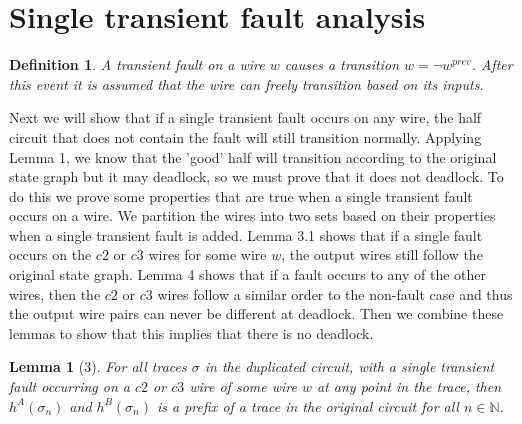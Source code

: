 \documentclass[12pt]{report}
\newtheorem*{definition}{Definition}
\newtheorem*{lemma}{Lemma}
\begin{document}
\section{Single transient fault analysis}
\begin{definition}A transient fault on a wire $w$ causes a transition $w= \lnot w^{prev}$.  After this event it is assumed that the wire can freely transition based on its inputs. %
\end{definition}
Next we will show that if a single transient fault occurs on any wire, the half circuit that does not contain the fault will still transition normally.  Applying Lemma 1, we know that the 'good' half will transition according to the original state graph but it may deadlock, so we must prove that it does not deadlock.  To do this we prove some properties that are true when a single transient fault occurs on a wire.  We partition the wires into two sets based on their properties when a single transient fault is added.  Lemma 3.1 shows that if a single fault occurs on the $c2$ or $c3$ wires for some wire $w$, the output wires still follow the original state graph.  Lemma 4 shows that if a fault occurs to any of the other wires, then the $c2$ or $c3$ wires follow a similar order to the non-fault case and thus the output wire pairs can never be different at deadlock.  Then we combine these lemmas to show that this implies that there is no deadlock.
\begin{lemma}[3]
For all traces $\sigma$ in the duplicated circuit, with a single transient fault occurring on a $c2$ or $c3$ wire of some wire $w$ at any point in the trace, then $h^{A}(\sigma_n)$ and $h^{B}(\sigma_n)$ is a prefix of a trace in the original circuit for all $n \in \mathbb{N}$.
\end{lemma}
\end{document}
